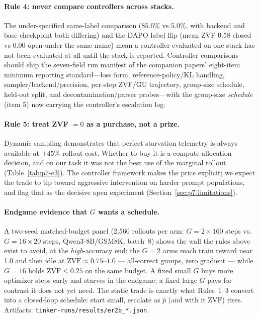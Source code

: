 \documentclass{article}
\begin{document}
\paragraph{Rule 4: never compare controllers across stacks.} The
under-specified same-label comparison ($85.6\%$ vs $5.0\%$, with backend and
base checkpoint both differing) and the DAPO label flip (mean ZVF $0.58$
closed vs $0.00$ open under
the same name) mean a controller evaluated on one stack has not been
evaluated at all until the stack is reported. Controller comparisons should
ship the seven-field run manifest of the companion papers' eight-item
minimum reporting standard---loss form,
reference-policy/KL handling, sampler/backend/precision, per-step ZVF/GU
trajectory, group-size schedule, held-out split, and
decontamination/parser probes---with the group-size \emph{schedule} (item
5) now carrying the controller's escalation log.

\paragraph{Rule 5: treat ZVF $= 0$ as a purchase, not a prize.} Dynamic
sampling demonstrates that perfect starvation telemetry is always available
at $+45\%$ rollout cost. Whether to buy it is a compute-allocation
decision, and on our task it was not the best use of the marginal rollout
(Table~\ref{tab:p7-e3}). The controller framework makes the price explicit;
we expect the trade to tip toward aggressive intervention on harder prompt
populations, and flag that as the decisive open experiment
(Section~\ref{sec:p7-limitations}).

\paragraph{Endgame evidence that $G$ wants a schedule.} A two-seed
matched-budget panel (2{,}560 rollouts per arm: $G{=}2\times160$ steps
vs.\ $G{=}16\times20$ steps, Qwen3-8B/GSM8K, batch~8) shows the wall the
rules above exist to avoid, at the \emph{high}-accuracy end: the $G{=}2$
arms reach train reward near 1.0 and then idle at
$\mathrm{ZVF}\approx0.75$--$1.0$ --- all-correct groups, zero gradient
--- while $G{=}16$ holds $\mathrm{ZVF}\le0.25$ on the same budget. A
fixed small $G$ buys more optimizer steps early and starves in the
endgame; a fixed large $G$ pays for contrast it does not yet need. The
static trade is exactly what Rules~1--3 convert into a closed-loop
schedule: start small, escalate as $\hat p$ (and with it
$\mathrm{ZVF}$) rises. Artifacts:
\texttt{tinker-runs/results/er2b\_*.json}.
\end{document}
